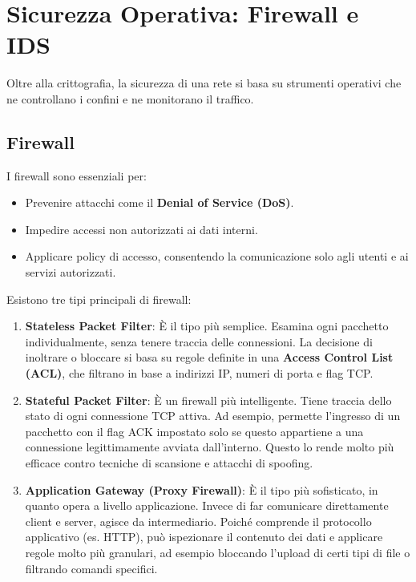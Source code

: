 \section{Sicurezza Operativa: Firewall e IDS}
Oltre alla crittografia, la sicurezza di una rete si basa su strumenti operativi che ne controllano i confini e ne monitorano il traffico.

\subsection{Firewall}



I firewall sono essenziali per:
\begin{itemize}
    \item Prevenire attacchi come il \textbf{Denial of Service (DoS)}.
    \item Impedire accessi non autorizzati ai dati interni.
    \item Applicare policy di accesso, consentendo la comunicazione solo agli utenti e ai servizi autorizzati.
\end{itemize}

Esistono tre tipi principali di firewall:
\begin{enumerate}
    \item \textbf{Stateless Packet Filter}: È il tipo più semplice. Esamina ogni pacchetto individualmente, senza tenere traccia delle connessioni. La decisione di inoltrare o bloccare si basa su regole definite in una \textbf{Access Control List (ACL)}, che filtrano in base a indirizzi IP, numeri di porta e flag TCP.
    \item \textbf{Stateful Packet Filter}: È un firewall più intelligente. Tiene traccia dello stato di ogni connessione TCP attiva. Ad esempio, permette l'ingresso di un pacchetto con il flag ACK impostato solo se questo appartiene a una connessione legittimamente avviata dall'interno. Questo lo rende molto più efficace contro tecniche di scansione e attacchi di spoofing.
    \item \textbf{Application Gateway (Proxy Firewall)}: È il tipo più sofisticato, in quanto opera a livello applicazione. Invece di far comunicare direttamente client e server, agisce da intermediario. Poiché comprende il protocollo applicativo (es. HTTP), può ispezionare il contenuto dei dati e applicare regole molto più granulari, ad esempio bloccando l'upload di certi tipi di file o filtrando comandi specifici.
\end{enumerate}

